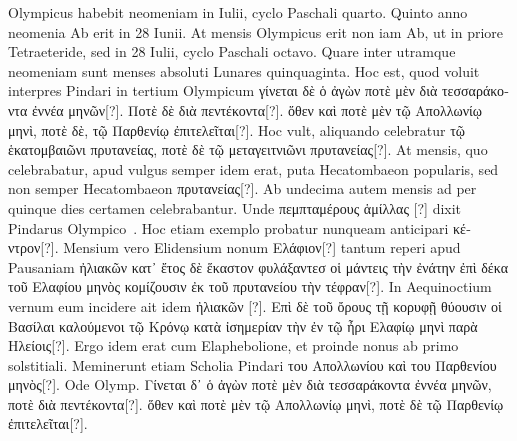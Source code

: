 Olympicus habebit neomeniam in  Iulii, cyclo Paschali quarto.
Quinto
anno neomenia Ab erit in 28 Iunii.
At mensis Olympicus erit non iam
Ab, ut in priore Tetraeteride, sed in 28 Iulii, cyclo Paschali octavo.
Quare inter utramque neomeniam sunt menses absoluti
 Lunares quinquaginta.
Hoc est, quod voluit interpres Pindari in tertium Olympicum
\textgreek{γίνεται δὲ ὁ ἀγὼν ποτὲ μὲν διὰ τεσσαράκοντα ἐννέα μηνῶν[?]}.
\textgreek{Ποτὲ δὲ διὰ πεντέκοντα[?]}.
\textgreek{ὅθεν καὶ ποτὲ μὲν τῷ Απολλωνίῳ μηνὶ,
 ποτὲ δὲ, τῷ Παρθενίῳ ἐπιτελεῖται[?]}.
Hoc
vult, aliquando celebratur
 \textgreek{τῷ ἑκατομβαιῶνι πρυτανείας, ποτὲ δὲ τῷ μεταγειτνιῶνι
πρυτανείας[?]}.
At mensis, quo celebrabatur, apud vulgus semper
idem erat, puta Hecatombaeon popularis, sed non semper Hecatombaeon
\textgreek{πρυτανείας[?]}.
Ab undecima autem mensis ad  per quinque
dies certamen celebrabantur.
Unde \textgreek{πεμπταμέρους ἁμίλλας [?]} dixit Pindarus
Olympico~.
%
Hoc etiam exemplo probatur nunqueam anticipari
\textgreek{κέντρον[?]}.
Mensium vero Elidensium nonum \textgreek{Ελάφιον[?]} tantum reperi apud
Pausaniam \textgreek{ἠλιακῶν  κατ᾽ ἔτος
 δὲ ἕκαστον φυλάξαντεσ οἱ μάντεις τὴν ἐνάτην
ἐπὶ δέκα τοῦ Ελαφίου μηνὸς κομίζουσιν ἐκ τοῦ πρυτανείου τὴν τέφραν[?]}.
In Aequinoctium
vernum eum incidere ait idem \textgreek{ἠλιακῶν [?]}.
\textgreek{Επὶ δὲ τοῦ ὄρους τῇ
κορυφῇ θύουσιν οἱ Βασίλαι καλούμενοι τῷ Κρόνῳ κατὰ ἰσημερίαν τὴν ἐν τῷ ἦρι
Ελαφίῳ μηνὶ παρὰ Ηλείοις[?]}.
Ergo idem erat cum Elaphebolione, et
proinde nonus ab primo solstitiali.
Meminerunt etiam Scholia Pindari
\textgreek{του Απολλωνίου καὶ του Παρθενίου μηνὸς[?]}.
Ode  Olymp.
\textgreek{Γίνεται δ᾽ ὁ ἀγὼν ποτὲ
μὲν διὰ τεσσαράκοντα ἐννέα μηνῶν, ποτὲ διὰ πεντέκοντα[?]}.
\textgreek{ὅθεν καὶ ποτὲ μὲν τῷ Απολλωνίῳ
μηνὶ, ποτὲ δὲ τῷ Παρθενίῳ ἐπιτελεῖται[?]}.

